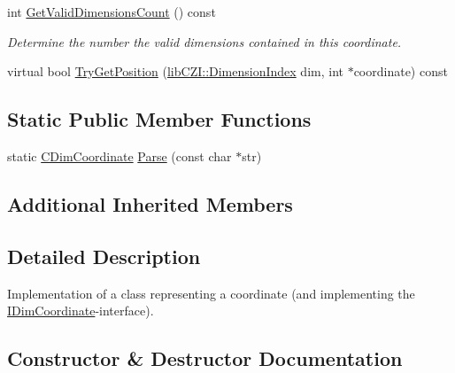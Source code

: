 \begin{DoxyCompactItemize}
\item 
\mbox{\label{classlib_c_z_i_1_1_c_dim_coordinate_a94b1116ff62dc82965df419b46e73dac}} 
int \hyperlink{classlib_c_z_i_1_1_c_dim_coordinate_a94b1116ff62dc82965df419b46e73dac}{Get\+Valid\+Dimensions\+Count} () const
\begin{DoxyCompactList}\small\item\em Determine the number the valid dimensions contained in this coordinate. \end{DoxyCompactList}\item 
virtual bool \hyperlink{classlib_c_z_i_1_1_c_dim_coordinate_af7bc7e775a5971d46550e45ebf2b2ba7}{Try\+Get\+Position} (\hyperlink{namespacelib_c_z_i_a55049658acf59d0eddfaebcad16df424}{lib\+C\+Z\+I\+::\+Dimension\+Index} dim, int $\ast$coordinate) const
\end{DoxyCompactItemize}
\subsection*{Static Public Member Functions}
\begin{DoxyCompactItemize}
\item 
static \hyperlink{classlib_c_z_i_1_1_c_dim_coordinate}{C\+Dim\+Coordinate} \hyperlink{classlib_c_z_i_1_1_c_dim_coordinate_a684c17ad37de1e817c660e89e704d81e}{Parse} (const char $\ast$str)
\end{DoxyCompactItemize}
\subsection*{Additional Inherited Members}


\subsection{Detailed Description}
Implementation of a class representing a coordinate (and implementing the {\ttfamily \hyperlink{classlib_c_z_i_1_1_i_dim_coordinate}{I\+Dim\+Coordinate}}-\/interface). 

\subsection{Constructor \& Destructor Documentation}
\mbox{\label{classlib_c_z_i_1_1_c_dim_coordinate_a513ae54e9dc32c0c19040b94add75e80}} 
